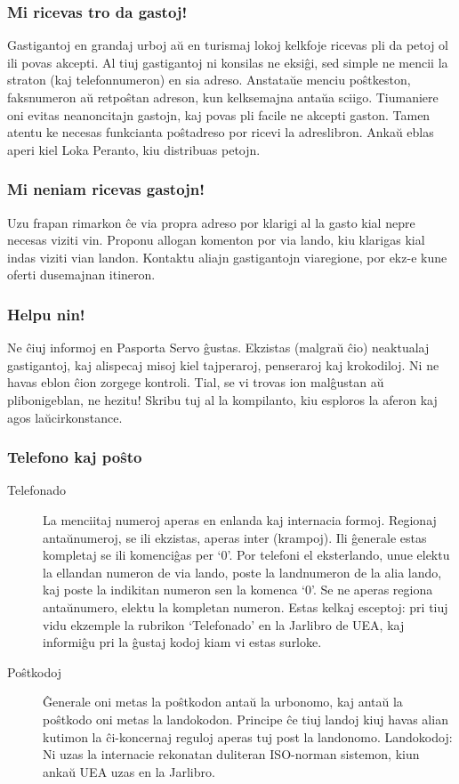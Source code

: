 \subsubsection{Mi ricevas tro da gastoj!}
Gastigantoj en grandaj urboj aŭ en turismaj lokoj kelkfoje ricevas pli da petoj ol
ili povas akcepti. Al tiuj gastigantoj ni konsilas ne eksiĝi, sed simple ne mencii
la straton (kaj tele­fonnumeron) en sia adreso. Anstataŭe menciu poŝtkeston,
faksnumeron aŭ retpoŝtan adreson, kun kelksemajna antaŭa sciigo. Tiumaniere oni
evitas neanoncitajn gastojn, kaj povas pli facile ne akcepti gaston. Tamen atentu
ke necesas funkcianta poŝtadreso por ricevi la adreslibron. Ankaŭ eblas aperi kiel
Loka Peranto, kiu distribuas petojn.

\subsubsection{Mi neniam ricevas gastojn!}
Uzu frapan rimarkon ĉe via propra adreso por klarigi al la gasto kial nepre necesas
viziti vin. Proponu allogan komenton por via lando, kiu klarigas kial indas viziti vian
landon. Kontaktu aliajn gastigantojn viaregione, por ekz-e kune oferti dusemajnan
itineron.
\subsubsection{Helpu nin!}
Ne ĉiuj informoj en Pasporta Servo ĝustas. Ekzistas (malgraŭ ĉio) neaktualaj
gastigantoj, kaj alispecaj misoj kiel tajperaroj, penseraroj kaj krokodiloj. Ni ne havas
eblon ĉion zorgege kontroli. Tial, se vi trovas ion malĝustan aŭ plibonigeblan,
ne hezitu! Skribu tuj al la kompilanto, kiu esploros la aferon kaj agos laŭcirkonstance.
\subsubsection{Telefono kaj poŝto}
\begin{description}
    \item[Telefonado] La menciitaj numeroj aperas en enlanda kaj internacia formoj. Regionaj
antaŭnumeroj, se ili ekzistas, aperas inter (krampoj). Ili ĝenerale estas kompletaj se
ili komenciĝas per ‘0’. Por telefoni el eksterlando, unue elektu la ellandan numeron
de via lando, poste la landnumeron de la alia lando, kaj poste la indikitan numeron
sen la komenca ‘0’. Se ne aperas regiona antaŭnumero, elektu la kompletan
numeron. Estas kelkaj esceptoj: pri tiuj vidu ekzemple la rubrikon ‘Telefonado’ en la
Jarlibro de UEA, kaj informiĝu pri la ĝustaj kodoj kiam vi estas surloke.

    \item[Poŝtkodoj] Ĝenerale oni metas la poŝtkodon antaŭ la urbonomo, kaj antaŭ la
poŝtkodo oni metas la landokodon. Principe ĉe tiuj landoj kiuj havas alian kutimon
la ĉi-koncernaj reguloj aperas tuj post la landonomo.
Landokodoj: Ni uzas la internacie rekonatan duliteran ISO-norman sistemon, kiun
ankaŭ UEA uzas en la Jarlibro.
\end{description}